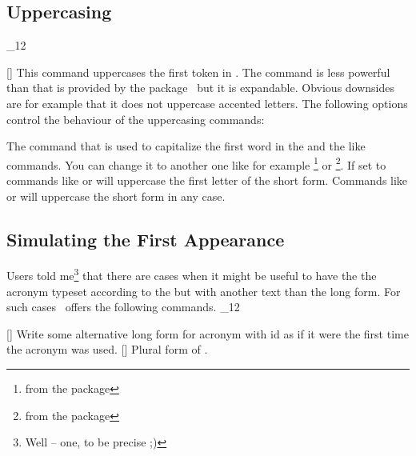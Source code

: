 \documentclass[load-preamble+]{cnltx-doc}
\makeatletter
\renewenvironment{commands}
  {%
    \cnltx@set@catcode_{12}%
    \let\command\cnltx@command
    \cnltxlist
  }
  {\endcnltxlist}
\makeatother
\begin{document}
\subsection{Uppercasing}
\begin{commands}
  \command{acfirstupper}[]
     This command uppercases the first token in .  The
     command is less powerful than  that is provided by the
      package~\cite{pkg:mfirstuc} but it is expandable.  Obvious
     downsides are for example that it does not uppercase accented letters.
\end{commands}
The following options control the behaviour of the uppercasing commands:
\begin{options}
    The command that is used to capitalize the first word in the  and
    the like commands.  You can change it to another one like for example
    \footnote{from the  package} or
    \footnote{from the  package}.
    If set to  commands like  or 
    will uppercase the first letter of the short form.  Commands like 
    or  will uppercase the short form in any case.
\end{options}

\subsection{Simulating the First Appearance}\label{sec:simul-first-appe}
Users told me\footnote{Well -- one, to be precise ;)} that there are cases
when it might be useful to have the the acronym typeset according to the
 but with another text than the long form.  For such cases
\acro\ offers the following commands.
\begin{commands}
  \command{acflike}[\sarg{}]
    Write some alternative long form for acronym with \acs{id}  as if
    it were the first time the acronym was used.
  \command{acfplike}[\sarg{}]
    Plural form of .
\end{commands}

\begin{example}
\end{example}
\end{document}
